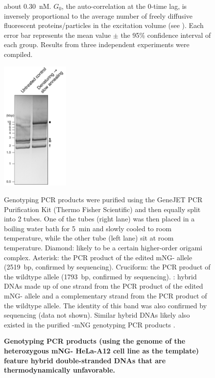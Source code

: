 \begin{figure} [t!]
about \SI{0.30}{nM}. $G_0$, the auto-correlation at the 0-time lag, is inversely proportional to the average number of freely diffusive fluorescent proteins/particles in the excitation volume (see ). Each error bar represents the mean value $\pm$ the 95\% confidence interval of each group. Results from three independent experiments were compiled.
\end{figure}

\begin{figure}
    \centering
    \includegraphics[width=0.3\textwidth]{chapters/figures/HybridGenotypingdsDNA.pdf}
    \caption{\textbf{Genotyping PCR products (using the genome of the heterozygous mNG- HeLa-A12 cell line as the template) feature hybrid double-stranded DNAs that are thermodynamically unfavorable.}}
    \noindent\justifying Genotyping PCR products were purified using the GeneJET PCR Purification Kit (Thermo Fisher Scientific) and then equally split into 2 tubes. One of the tubes (right lane) was then placed in a boiling water bath for \SI{5}{min} and slowly cooled to room temperature, while the other tube (left lane) sit at room temperature. Diamond: likely to be a certain higher-order origami complex. Asterisk: the PCR product of the edited mNG- allele (\SI{2519}{bp}, confirmed by sequencing). Cruciform: the PCR product of the wildtype  allele (\SI{1793}{bp}, confirmed by sequencing). \underline{\textOmega{}}: hybrid DNAs made up of one strand from the PCR product of the edited mNG- allele and a complementary strand from the PCR product of the wildtype  allele. The identity of this band was also confirmed by sequencing (data not shown). Similar hybrid DNAs likely also existed in the purified -mNG genotyping PCR products .
    \label{HybridGenotypingdsDNA}
\end{figure}

